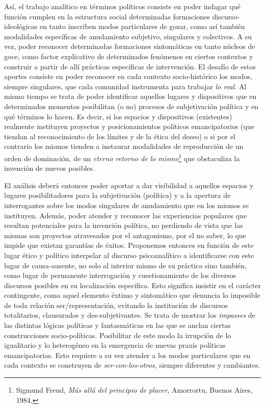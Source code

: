 \documentclass{book}
\begin{document}
Así, el trabajo analítico en términos políticos consiste en poder
indagar qué función cumplen en la estructura social determinadas
formaciones discurso-ideológicas en tanto inscriben modos particulares
de gozar, como así también modalidades específicas de anudamiento
subjetivo, singulares y colectivos. A su vez, poder reconocer
determinadas formaciones sintomáticas en tanto núcleos de goce, como
factor explicativo de determinados fenómenos en ciertos contextos y
construir a partir de allí prácticas específicas de intervención. El
desafío de estos aportes consiste en poder reconocer en cada contexto
socio-histórico los modos, siempre singulares, que cada comunidad
instrumenta para trabajar \emph{lo real.} Al mismo tiempo se trata de
poder identificar aquellos lugares y dispositivos que en determinados
momentos posibilitan (o no) procesos de subjetivación política y en qué
términos lo hacen. Es decir, si los espacios y dispositivos (existentes)
realmente instituyen proyectos y posicionamientos políticos
emancipatorios (que tiendan al reconocimiento de los límites y de la
ética del deseo) o si por el contrario los mismos tienden a instaurar
modalidades de reproducción de un orden de dominación, de un
\emph{eterno retorno de lo mismo}\footnote{Sigmund Freud, \emph{Más allá
  del principio de placer,} Amorrortu, Buenos Aires, 1984.} que
obstaculiza la invención de nuevos posibles.

El análisis deberá entonces poder aportar a dar visibilidad a aquellos
espacios y lugares posibilitadores para la subjetivación (política) y a
la apertura de interrogantes sobre los modos singulares de anudamiento
que en los mismos se instituyen. Además, poder atender y reconocer las
experiencias populares que resultan potenciales para la invención
política, no perdiendo de vista que las mismas son proyectos atravesados
por el antagonismo, por el no saber, lo que impide que existan garantías
de éxitos. Proponemos entonces en función de este lugar ético y político
interpelar al discurso psicoanalítico a identificarse con este lugar de
causa-ausente, no solo al interior mismo de su práctica sino también,
como lugar de permanente interrogación y cuestionamiento de los diversos
discursos posibles en su localización específica. Esto significa
insistir en el carácter contingente, como aquel elemento éxtimo y
sintomático que denuncia lo imposible de toda relación
ser/representación, evitando la institución de discursos totalitarios,
clausurados y des-subjetivantes. Se trata de mostrar los \emph{impasses}
de las distintas lógicas políticas y fantasmáticas en las que se anclan
ciertas construcciones socio-políticas. Posibilitar de este modo la
irrupción de lo igualitario y lo heterogéneo en la emergencia de nuevas
praxis políticas emancipatorias. Esto requiere a su vez atender a los
modos particulares que en cada contexto se construyen de
\emph{ser-con-los-otros}, siempre diferentes y cambiantes.
\end{document}
